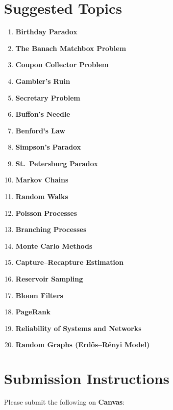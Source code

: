 \documentclass[11pt]{article}
\begin{document}
\section*{Suggested Topics}
\begin{enumerate}[leftmargin=*]
    \item \textbf{Birthday Paradox}
    \item \textbf{The Banach Matchbox Problem}
    \item \textbf{Coupon Collector Problem}
    \item \textbf{Gambler's Ruin}
    \item \textbf{Secretary Problem}
    \item \textbf{Buffon's Needle}
    \item \textbf{Benford's Law}
    \item \textbf{Simpson's Paradox}
    \item \textbf{St.\ Petersburg Paradox}
    \item \textbf{Markov Chains}
    \item \textbf{Random Walks}
    \item \textbf{Poisson Processes}
    \item \textbf{Branching Processes}
    \item \textbf{Monte Carlo Methods}
    \item \textbf{Capture--Recapture Estimation}
    \item \textbf{Reservoir Sampling}
    \item \textbf{Bloom Filters}
    \item \textbf{PageRank}
    \item \textbf{Reliability of Systems and Networks}
    \item \textbf{Random Graphs (Erd\H{o}s--R\'enyi Model)}
\end{enumerate}

\section*{Submission Instructions}

Please submit the following on \textbf{Canvas}:
\end{document}
